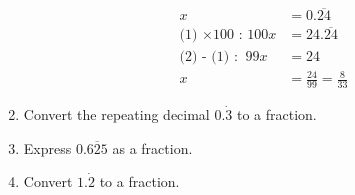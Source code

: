 \documentclass{article}
\begin{document}
\begin{enumerate}
\setcounter{equation}{0}

\begin{align}
x&=0.\overline{24}\\
\text{(1) $\times 100$ : }
100x&=24.\overline{24}\\
\text{(2) - (1) : }
\ 99x&=24\\
x&=\frac{24}{99}=\frac{8}{33}
\end{align}

\item Convert the repeating decimal $0.\dot{3}$ to a fraction.
\item Express $0.\overline{625}$ as a fraction.
\item Convert $1.\dot{2}$ to a fraction.

\end{enumerate}
\end{document}
